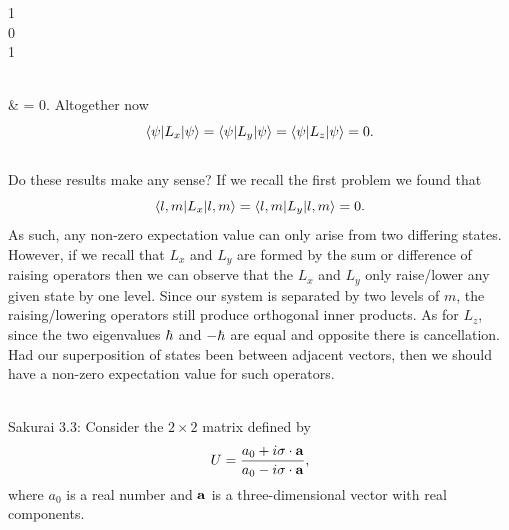 \documentclass[11pt,letterpaper]{article}
\begin{document}
			\begin{pmatrix}1\\0\\1\end{pmatrix}\\
			& = 0.
		\ea
		Altogether now
		\[
			 \braket{\psi|L_x|\psi} =   \braket{\psi|L_y|\psi} =   \braket{\psi|L_z|\psi} =0.
		\]
		\\
		Do these results make any sense? If we recall the first problem we found that 
		\[
			\braket{l,m|L_x|l,m} = \braket{l,m|L_y|l,m} = 0.
		\]
		As such, any non-zero expectation value can only arise from two differing states. However, if we recall that $L_x$
		and $L_y$ are formed by the sum or difference of raising operators then we can observe that the $L_x$ and $L_y$
		only raise/lower any given state by one level. Since our system is separated by two levels of $m$, the raising/lowering
		operators still produce orthogonal inner products. As for $L_z$, since the two eigenvalues $\hbar$ and $-\hbar$ are equal
		and opposite there is cancellation. Had our superposition of states been between adjacent vectors, then we should 
		have a non-zero expectation value for such operators. 
		\\
		\\
		\eenum

		
	\item 
	Sakurai 3.3: Consider the $2\times2$ matrix defined by
	\[
		U = \frac{a_0+i\mathbf{\sigma}\cdot \mathbf{a}}{a_0-i\mathbf{\sigma}\cdot\mathbf{a}},
	\]
	where $a_0$ is a real number and $\mathbf{a}$ is a three-dimensional vector with real components. 
	
\end{document}
